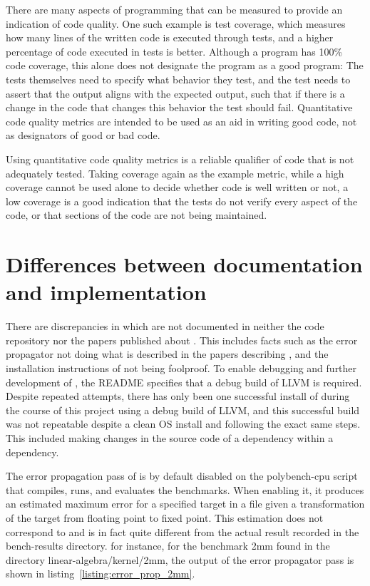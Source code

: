 There are many aspects of programming that can be measured to provide an indication of code quality. One such example is test coverage, which measures how many lines of the written code is executed through tests, and a higher percentage of code executed in tests is better. Although a program has 100\% code coverage, this alone does not designate the program as a good program: The tests themselves need to specify what behavior they test, and the test needs to assert that the output aligns with the expected output, such that if there is a change in the code that changes this behavior the test should fail. Quantitative code quality metrics are intended to be used as an aid in writing good code, not as designators of good or bad code. 

Using quantitative code quality metrics is a reliable qualifier of code that is not adequately tested. Taking coverage again as the example metric, while a high coverage cannot be used alone to decide whether code is well written or not, a low coverage is a good indication that the tests do not verify every aspect of the code, or that sections of the code are not being maintained.


\section{Differences between documentation and implementation}

There are discrepancies in \taffo{} which are not documented in neither the code repository nor the papers published about \taffo{}. 
This includes facts such as the error propagator not doing what is described in the papers describing \taffo{},  and the installation instructions of \taffo{} not being foolproof. To enable debugging and further development of \taffo{}, the README specifies that a debug build of LLVM is required. Despite repeated attempts, there has only been one successful install of \taffo{} during the course of this project using a debug build of LLVM, and this successful build was not repeatable despite a clean OS install and following the exact same steps. This included making changes in the source code of a dependency within a \taffo{} dependency.  

The error propagation pass of \taffo{} is by default disabled on the polybench-cpu script that compiles, runs, and evaluates the benchmarks. When enabling it, it produces an estimated maximum error for a specified target in a file given a transformation of the target from floating point to fixed point. This estimation does not correspond to and is in fact quite different from the actual result recorded in the bench-results directory. for instance, for the benchmark 2mm found in the directory linear-algebra/kernel/2mm, the output of the error propagator pass is shown in listing~\ref{listing:error_prop_2mm}.


